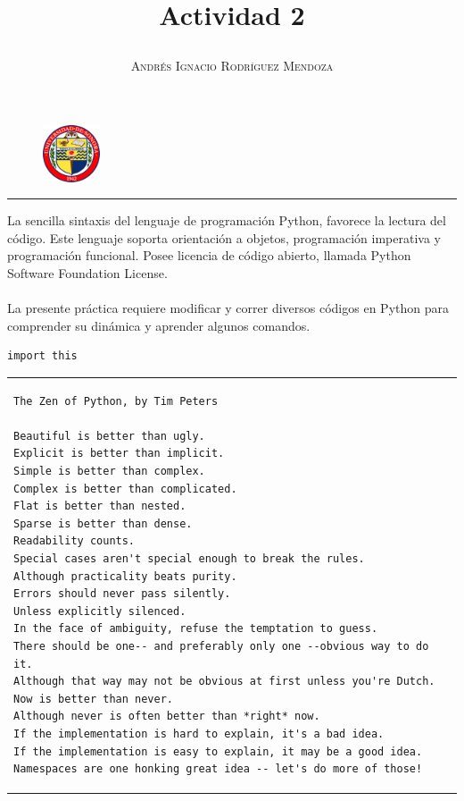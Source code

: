 \documentclass[11pt,spanish]{article}
\title{\vspace{-3cm}\begin{flushleft}\textbf{Actividad 2}\end{flushleft}}
\author{\hspace{-9.6cm}\textsc{Andrés Ignacio Rodríguez Mendoza}}
\date{}
\begin{document}
\begin{figure}
  \begin{center}
   \vspace{-5.4cm} \includegraphics[width=0.15\textwidth]{uni}
  \end{center}
\end{figure}

\maketitle
\begin{center}
\rule{\textwidth}{1pt}
\end{center}

La sencilla sintaxis del lenguaje de programación Python, favorece la lectura del código. Este lenguaje soporta orientación a objetos, programación imperativa y programación funcional.
Posee licencia de código abierto, llamada Python Software Foundation License.\\ \\
La presente práctica requiere modificar y correr diversos códigos en Python para comprender su dinámica y aprender algunos comandos.\\


\begin{lstlisting}
import this
\end{lstlisting} 

\begin{tabular}{|l}
\begin{minipage}{3in}

\begin{verbatim}
The Zen of Python, by Tim Peters

Beautiful is better than ugly.
Explicit is better than implicit.
Simple is better than complex.
Complex is better than complicated.
Flat is better than nested.
Sparse is better than dense.
Readability counts.
Special cases aren't special enough to break the rules.
Although practicality beats purity.
Errors should never pass silently.
Unless explicitly silenced.
In the face of ambiguity, refuse the temptation to guess.
There should be one-- and preferably only one --obvious way to do it.
Although that way may not be obvious at first unless you're Dutch.
Now is better than never.
Although never is often better than *right* now.
If the implementation is hard to explain, it's a bad idea.
If the implementation is easy to explain, it may be a good idea.
Namespaces are one honking great idea -- let's do more of those!
\end{verbatim}
\end{minipage}
\end{tabular} \\
\end{document}
